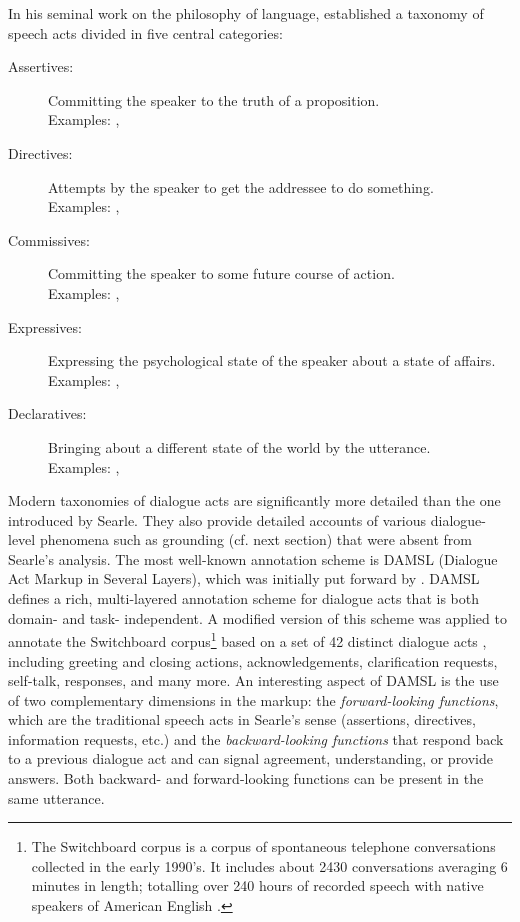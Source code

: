 In his seminal work on the philosophy of language, \cite{Searle1979} established a taxonomy of speech acts divided in five central categories:
\begin{description}
\item[Assertives: ] Committing the speaker to the truth of a proposition. \\
Examples: , 
\item[Directives: ]  Attempts by the speaker to get the addressee to do something. \\ Examples:  , 
\item[Commissives: ] Committing the speaker to some future course of action. \\ Examples: , 
\item[Expressives: ] Expressing the psychological state of the speaker about a state of affairs. \\ Examples: , 
\item[Declaratives: ] Bringing about a different state of the world by the utterance. \\ Examples: , 
\end{description}

Modern taxonomies of dialogue acts are significantly more detailed than the one introduced by Searle.  They also provide detailed accounts of various dialogue-level phenomena such as grounding (cf. next section) that were absent from Searle's analysis. The most well-known annotation scheme is DAMSL (Dialogue Act Markup in Several Layers), which was initially put forward by \cite{Core1997}.  DAMSL defines a rich, multi-layered annotation scheme for dialogue acts that is both domain- and task- independent.  A modified version of this scheme was applied to annotate the Switchboard corpus\footnote{The Switchboard corpus is a corpus of spontaneous telephone conversations collected in the early 1990's.  It includes about 2430 conversations averaging 6 minutes in length; totalling over 240 hours of recorded speech with native speakers of American English \citep{Godfrey1992}.} based on a set of 42 distinct dialogue acts \citep{Jurafsky1997}, including greeting and closing actions, acknowledgements, clarification requests, self-talk, responses, and many more.  An interesting aspect of DAMSL is the use of two complementary dimensions in the markup: the \textit{forward-looking functions}, which are the traditional speech acts in Searle's sense (assertions, directives, information requests, etc.) and the \textit{backward-looking functions} that respond back to a previous dialogue act and can signal agreement, understanding, or provide answers.  Both backward- and forward-looking functions can be present in the same utterance. 


